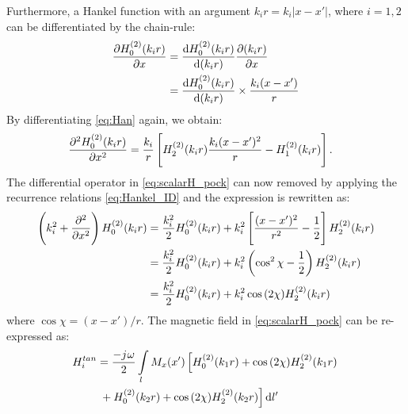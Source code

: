 \documentclass[12pt]{article}
\begin{document}
%
Furthermore, a Hankel function with an argument $ k_i r = k_i|x - x'|$, where $i = 1,2$ can be differentiated by the chain-rule:
%
\begin{equation}
  \begin{split}
    \pdv{H_0^{(2)}(k_i r)}{x} &= \dv{H_0^{(2)}(k_i r)}{(k_i r)} \pdv{(k_i r)}{x} \\
    &= \dv{H_0^{(2)}(k_i r)}{(k_i r)} \times \frac{k_i (x - x')}{r}
  \end{split}
  \label{eq:Han}
\end{equation}
%
By differentiating \eqref{eq:Han} again, we obtain:
%
\begin{align}
  \pdv[2]{H_0^{(2)}(k_i r)}{x} &= \frac{k_i}{r} \left[H_2^{(2)}(k_i r) \frac{k_i (x - x')^2}{r} - H_1^{(2)}(k_i r) \right].
  \label{eq:difHan}
\end{align}
%
The differential operator in \eqref{eq:scalarH_pock} can now removed by applying the recurrence relations \eqref{eq:Hankel_ID} and the expression is rewritten as:
%
\begin{equation}
  \begin{split}
    \left(k_i^2 + \pdv[2]{}{x} \right) H_0^{(2)}(k_i r) &= \frac{k_i^2}{2} H_0^{(2)}(k_i r) + k_i^2 \left[ \frac{(x-x')^2}{r^2} - \frac{1}{2} \right] H_2^{(2)}(k_i r) \\
    &= \frac{k_i^2}{2} H_0^{(2)}(k_i r) + k_i^2 \left( \cos^2 \chi - \frac{1}{2} \right) H_2^{(2)}(k_i r) \\
    &= \frac{k_i^2}{2} H_0^{(2)}(k_i r) + k_i^2 \cos {(2\chi)} H_2^{(2)}(k_i r)
  \end{split}
  \label{eq:Hankel_final}
\end{equation}
%
where $\cos \chi = {(x-x')/r}$. The magnetic field in \eqref{eq:scalarH_pock} can be re-expressed as:
%
\begin{align}
  H_i^{tan} &=  \frac{-{j}\mkern1mu \omega}{2} \int\limits_{l} M_x(x') \left[ H_0^{(2)}(k_1 r) + \cos {(2 \chi)} H_2^{(2)}(k_1 r) \right. \notag\\
  & \left. {} + H_0^{(2)}(k_2 r) + \cos {(2\chi)} H_2^{(2)}(k_2 r)\right]\mathop{}\!\mathrm{d}{l'}
  \label{eq:H_final}
\end{align}
%
%
%
\end{document}
